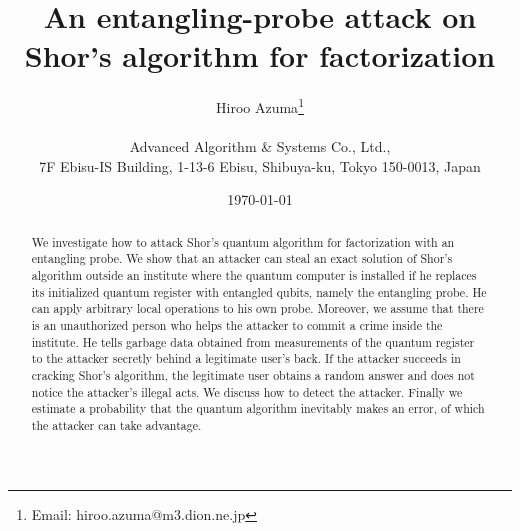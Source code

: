 \documentclass[12pt]{article}
\begin{document}
\title{An entangling-probe attack on Shor's algorithm for factorization}

\author{Hiroo Azuma\thanks{Email: hiroo.azuma@m3.dion.ne.jp}
\\
\\
{\small Advanced Algorithm \& Systems Co., Ltd.,}\\
{\small 7F Ebisu-IS Building, 1-13-6 Ebisu, Shibuya-ku, Tokyo 150-0013, Japan}\\
}

\date{\today}

\maketitle

\begin{abstract}
We investigate how to attack Shor's quantum algorithm for factorization
with an entangling probe.
We show that an attacker can steal
an exact solution of Shor's algorithm outside an institute where the quantum computer is installed
if he replaces its initialized quantum register with entangled qubits,
namely the entangling probe.
He can apply arbitrary local operations
to his own probe.
Moreover,
we assume that there is an unauthorized person who helps the attacker to commit a crime inside the institute.
He tells garbage data obtained from measurements of the quantum register to the attacker secretly behind a legitimate user's back.
If the attacker succeeds in cracking Shor's algorithm,
the legitimate user obtains a random answer and does not notice the attacker's illegal acts.
We discuss how to detect the attacker.
Finally we estimate a probability that the quantum algorithm inevitably makes an error,
of which the attacker can take advantage.
\end{abstract}
\end{document}
